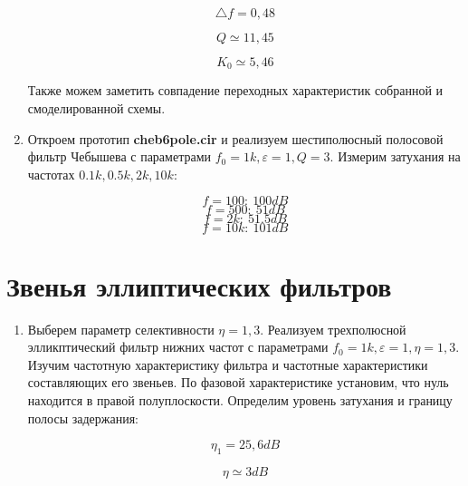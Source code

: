 \documentclass[a4paper, 12pt]{article}%
\begin{document}
\begin{enumerate}
\[\bigtriangleup f = 0,48\]

\[Q \simeq 11,45\]

\[K_0 \simeq 5,46\]

Также можем заметить совпадение переходных характеристик собранной и смоделированной схемы.

\item Откроем прототип \textbf{cheb6pole.cir} и реализуем шестиполюсный полосовой фильтр Чебышева с параметрами $f_0 = 1k, \varepsilon = 1, Q = 3$. Измерим затухания на частотах $0.1k,0.5k, 2k, 10k$:

\[f = 100: \: 100 dB\]
\[f = 500: \: 51 dB\]
\[f = 2k: \: 51.5 dB\]
\[f = 10k: \: 101 dB\]

\end{enumerate}

\section{Звенья эллиптических фильтров}

\begin{enumerate}

\item Выберем параметр селективности $\eta = 1,3$. Реализуем трехполюсной элликптический фильтр нижних частот с параметрами $f_0 = 1k, \varepsilon = 1, \eta = 1,3$. Изучим частотную характеристику фильтра и частотные характеристики составляющих его звеньев. По фазовой характеристике установим, что нуль находится в правой полуплоскости. Определим уровень затухания и границу полосы задержания:

\[\eta_1 = 25,6 dB\]

\[\eta \simeq 3 dB\]

\end{enumerate}
\end{document}
